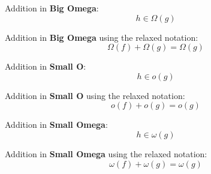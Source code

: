   \begin{lemma} Addition in \textbf{Big Omega}: 
 \[  h \in \Omega(g)\]
  \end{lemma}
   \begin{corollary} Addition in \textbf{Big Omega} using the relaxed notation: 
  \[  \Omega(f) + \Omega(g) = \Omega(g)\]
  \end{corollary}
  
  \begin{lemma} Addition in \textbf{Small O}:
 \[  h \in o(g)\]
  \end{lemma}
  \begin{corollary} Addition in \textbf{Small O} using the relaxed notation:
  \[  o(f) + o(g) = o(g)\]
  \end{corollary}  
  
  \begin{lemma} Addition in \textbf{Small Omega}:
 \[  h \in \omega(g)\]
  \end{lemma}
  \begin{corollary} Addition in \textbf{Small Omega} using the relaxed notation:
  \[  \omega(f) + \omega(g) = \omega(g)\]
  \end{corollary}
